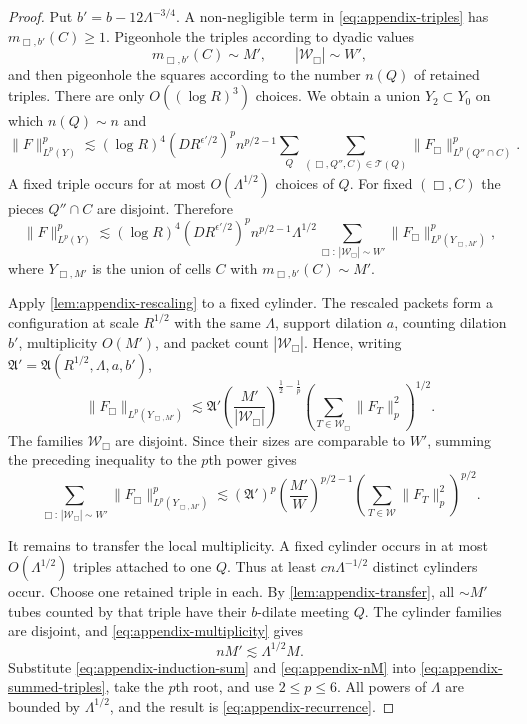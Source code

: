 \documentclass[10pt,a4paper]{amsart}
\begin{document}
\begin{proof}
Put $b'=b-12\Lambda^{-3/4}$.  A non-negligible term in
\eqref{eq:appendix-triples} has $m_{\Box,b'}(C)\ge1$.  Pigeonhole the triples
according to dyadic values
\[
 m_{\Box,b'}(C)\sim M',\qquad |\mathcal W_\Box|\sim W',
\]
and then pigeonhole the squares according to the number
$n(Q)$ of retained triples.  There are only $O((\log R)^3)$ choices.  We
obtain a union $Y_2\subset Y_0$ on which $n(Q)\sim n$ and
\begin{equation}\label{eq:appendix-pigeonholed}
 \|F\|_{L^p(Y)}^p
 \lesssim (\log R)^4
 (D R^{\epsilon'/2})^p n^{p/2-1}
 \sum_Q\sum_{(\Box,Q'',C)\in\mathcal T(Q)}
 \|F_\Box\|_{L^p(Q''\cap C)}^p.
\end{equation}
A fixed triple occurs for at most $O(\Lambda^{1/2})$ choices of $Q$.  For
fixed $(\Box,C)$ the pieces $Q''\cap C$ are disjoint.  Therefore
\begin{equation}\label{eq:appendix-summed-triples}
 \|F\|_{L^p(Y)}^p
 \lesssim (\log R)^4(DR^{\epsilon'/2})^p
 n^{p/2-1}\Lambda^{1/2}
 \sum_{\Box:\,|\mathcal W_\Box|\sim W'}
 \|F_\Box\|_{L^p(Y_{\Box,M'})}^p,
\end{equation}
where $Y_{\Box,M'}$ is the union of cells $C$ with
$m_{\Box,b'}(C)\sim M'$.

Apply \cref{lem:appendix-rescaling} to a fixed cylinder.  The rescaled
packets form a configuration at scale $R^{1/2}$ with the same $\Lambda$,
support dilation $a$, counting dilation $b'$, multiplicity $O(M')$, and
packet count $|\mathcal W_\Box|$.  Hence, writing
$\mathfrak A'=\mathfrak A(R^{1/2},\Lambda,a,b')$,
\[
 \|F_\Box\|_{L^p(Y_{\Box,M'})}
 \lesssim \mathfrak A'
 \left(\frac{M'}{|\mathcal W_\Box|}\right)^{\frac12-\frac1p}
 \left(\sum_{T\in\mathcal W_\Box}\|F_T\|_p^2\right)^{1/2}.
\]
The families $\mathcal W_\Box$ are disjoint.  Since their sizes are
comparable to $W'$, summing the preceding inequality to the $p$th power gives
\begin{equation}\label{eq:appendix-induction-sum}
 \sum_{\Box:\,|\mathcal W_\Box|\sim W'}
 \|F_\Box\|_{L^p(Y_{\Box,M'})}^p
 \lesssim
 (\mathfrak A')^p
 \left(\frac{M'}{W}\right)^{p/2-1}
 \left(\sum_{T\in\mathcal W}\|F_T\|_p^2\right)^{p/2}.
\end{equation}

It remains to transfer the local multiplicity.  A fixed cylinder occurs in
at most $O(\Lambda^{1/2})$ triples attached to one $Q$.  Thus at least
$cn\Lambda^{-1/2}$ distinct cylinders occur.  Choose one retained triple in
each.  By \cref{lem:appendix-transfer}, all $\sim M'$ tubes counted by that
triple have their $b$-dilate meeting $Q$.  The cylinder families are
disjoint, and \eqref{eq:appendix-multiplicity} gives
\begin{equation}\label{eq:appendix-nM}
 nM'\lesssim\Lambda^{1/2}M.
\end{equation}
Substitute \eqref{eq:appendix-induction-sum} and
\eqref{eq:appendix-nM} into \eqref{eq:appendix-summed-triples}, take the
$p$th root, and use $2\le p\le6$.  All powers of $\Lambda$ are bounded by
$\Lambda^{1/2}$, and the result is \eqref{eq:appendix-recurrence}.
\end{proof}
\end{document}
